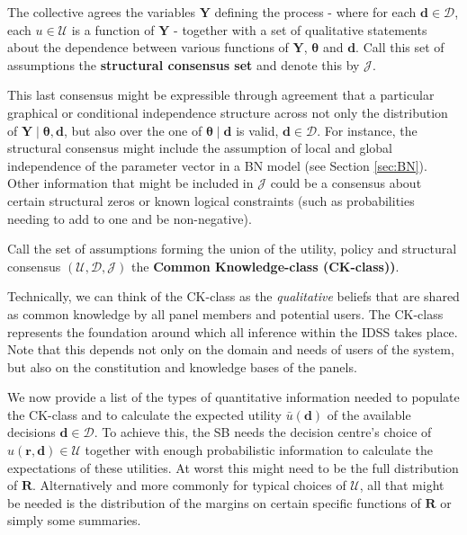 \begin{axiom}
\label{axiom:structural}
The collective agrees the variables $\bm{Y}$ defining the process - where for each $\bm{d}\in \bm{\mathcal{D}}$, each $u\in \mathcal{U}$ is a function of $\bm{Y}$ - together with a set of qualitative statements about the dependence between various functions of $\bm{Y}$, $\bm{\theta }$ and $\bm{d}$. Call this set of assumptions the \textbf{structural consensus set} and denote this by $\mathcal{J}$.
\end{axiom}
This last consensus might be expressible through agreement that a particular graphical or conditional independence structure across not only the distribution of $ \bm{Y}\;|\;\bm{\theta }, \bm{d}$,  but also over the one of $\bm{\theta }\;|\;\bm{d}$ is valid, $\bm{d}\in\bm{\mathcal{D}}$. For instance, the structural consensus might include the assumption of local and global independence of the parameter vector in a BN model (see Section \ref{sec:BN}). Other information that might be included in $\mathcal{J}$ could be a consensus about certain structural zeros or known logical constraints (such as probabilities needing to add to one and be non-negative).

\begin{definition}
Call the set of assumptions forming the union of the utility, policy and structural consensus $\left( \mathcal{U},\bm{\mathcal{D}},\mathcal{J}\right) $ the \textbf{Common Knowledge-class (CK-class))}.
\end{definition}

Technically, we can think of the CK-class as the \emph{qualitative} beliefs that are shared as common knowledge by all  panel members and potential users. The CK-class represents the foundation around which all inference within the IDSS takes place. Note that this depends not only on the domain and needs of users of the system, but also on the constitution and knowledge bases of the panels.

We now provide a list of the types of quantitative information needed to populate the CK-class and to calculate the expected utility $\bar{u}(\bm{d})$ of the available decisions $\bm{d}\in\bm{\mathcal{D}}$. To achieve this, the SB  needs the decision centre's choice of $u(\bm{r},\bm{d})\in \mathcal{U}$ together with enough probabilistic information to calculate the expectations of these utilities. At worst this might need to be the full distribution of $\bm{R}$. Alternatively and more commonly for typical choices of $\mathcal{U}$, all that might be needed is the distribution of the margins on certain specific functions of $\bm{R}$ or simply some summaries. 

